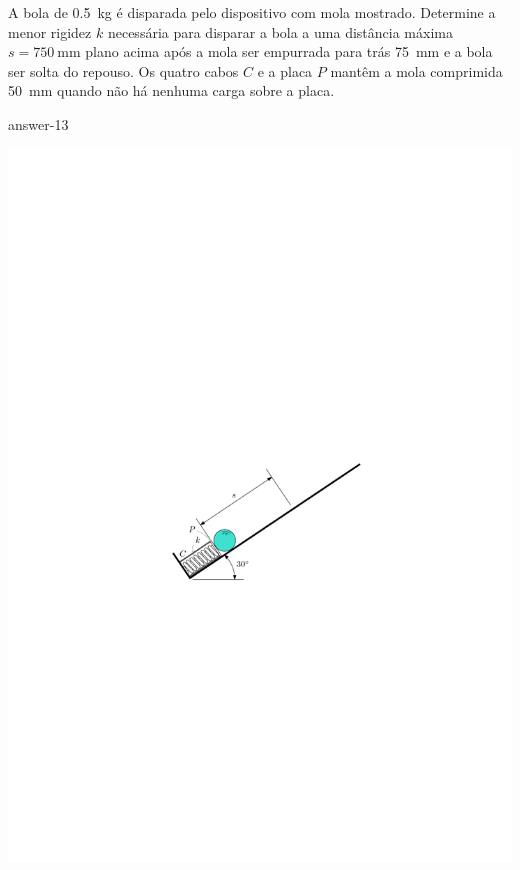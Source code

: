
\vspace{1cm}
\item A bola de \SI{0.5}{\kilogram} é disparada pelo dispositivo com mola mostrado. Determine a menor rigidez $k$ necessária para disparar a bola a uma distância máxima $s=\SI{750}{\milli\meter}$ plano acima após a mola ser empurrada para trás \SI{75}{\milli\meter} e a bola ser solta do repouso. Os quatro cabos $C$ e a placa $P$ mantêm a mola comprimida \SI{50}{\milli\meter} quando não há nenhuma carga sobre a placa.

{answer-13}

\vspace{2cm}
\begin{flushright}
	\includegraphics[scale=1.5]{images/draw_13.pdf}
\end{flushright}